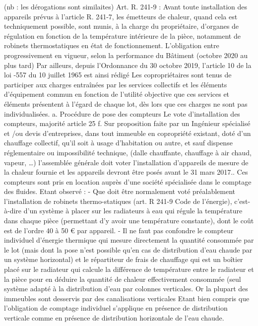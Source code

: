 		(nb : les dérogations sont similaites)
		Art. R. 241-9 : Avant toute installation des appareils prévus à l'article R. 241-7, les émetteurs de chaleur, quand cela est techniquement possible, sont munis, à la charge du propriétaire, d'organes de régulation en fonction de la température intérieure de la pièce, notamment de robinets thermostatiques en état de fonctionnement.
		L’obligation entre progressivement en vigueur, selon la performance du Bâtiment (octobre 2020 au plus tard)
		Par ailleurs, depuis l’Ordonnance du 30 octobre 2019, l’article 10 de la loi -557 du 10 juillet 1965 est ainsi rédigé
		Les copropriétaires sont tenus de participer aux charges entraînées par les services collectifs et les éléments d'équipement commun en fonction de l'utilité objective que ces services et éléments présentent à l'égard de chaque lot, dès lors que ces charges ne sont pas individualisées.
		a. Procédure de pose des compteurs
		Le vote d’installation des compteurs, majorité article 25 f.
		Sur proposition faite par un Ingénieur spécialisé et /ou devis d’entreprises, dans tout immeuble en copropriété existant, doté d’un chauffage collectif, qu’il soit à usage d’habitation ou autre, et sauf dispense réglementaire ou impossibilité technique, (dalle chauffante, chauffage à air chaud, vapeur, …) l’assemblée générale doit voter l’installation d’appareils de mesure de la chaleur fournie et les appareils devront être posés avant le 31 mars 2017..
		Ces compteurs sont pris en location auprès d’une société spécialisée dans le comptage des fluides.
		Etant observé :
		- Que doit être normalement voté préalablement l’installation de robinets thermo-statiques (art. R 241-9 Code de l’énergie), c’est-à-dire d’un système à placer sur les radiateurs à eau qui régule la température dans chaque pièce (permettant d’y avoir une température constante), dont le coût est de l’ordre 40 à 50 € par appareil.
		- Il ne faut pas confondre le compteur individuel d’énergie thermique qui mesure directement la quantité consommée par le lot (mais dont la pose n’est possible qu’en cas de distribution d’eau chaude par un système horizontal) et le répartiteur de frais de chauffage qui est un boîtier placé sur le radiateur qui calcule la différence de température entre le radiateur et la pièce pour en déduire la quantité de chaleur effectivement consommée (seul système adapté à la distribution d’eau par colonnes verticales. Or la plupart des immeubles sont desservis par des canalisations verticales Etant bien compris que l’obligation de comptage individuel s’applique en présence de distribution verticale comme en présence de distribution horizontale de l’eau chaude.
